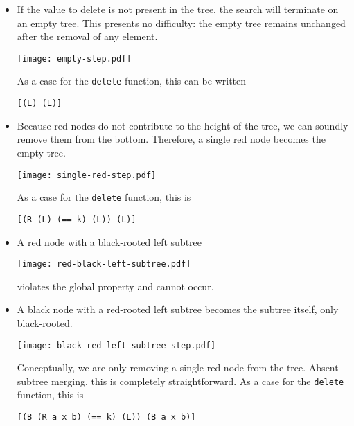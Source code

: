 \documentclass[preprint]{sigplanconf}
\begin{document}
\begin{itemize}

\item If the value to delete is not present in the tree, the search will terminate on an empty tree. This presents no difficulty: the empty tree remains unchanged after the removal of any element.
\begin{center}
\texttt{[image: empty-step.pdf]}
\end{center}
As a case for the \texttt{delete} function, this can be written
\begin{verbatim}
[(L) (L)]
\end{verbatim}

\item Because red nodes do not contribute to the height of the tree, we can soundly remove them from the bottom. Therefore, a single red node becomes the empty tree.
\begin{center}
\texttt{[image: single-red-step.pdf]}
\end{center}
As a case for the \texttt{delete} function, this is
\begin{verbatim}
[(R (L) (== k) (L)) (L)]
\end{verbatim}

\item A red node with a black-rooted left subtree
\begin{center}
\texttt{[image: red-black-left-subtree.pdf]}
\end{center}
violates the global property and cannot occur.

\item A black node with a red-rooted left subtree becomes the subtree itself, only black-rooted.
\begin{center}
\texttt{[image: black-red-left-subtree-step.pdf]}
\end{center}
Conceptually, we are only removing a single red node from the tree. Absent subtree merging, this is completely straightforward. As a case for the \texttt{delete} function, this is
\begin{verbatim}
[(B (R a x b) (== k) (L)) (B a x b)]
\end{verbatim}


\end{itemize}
\end{document}
